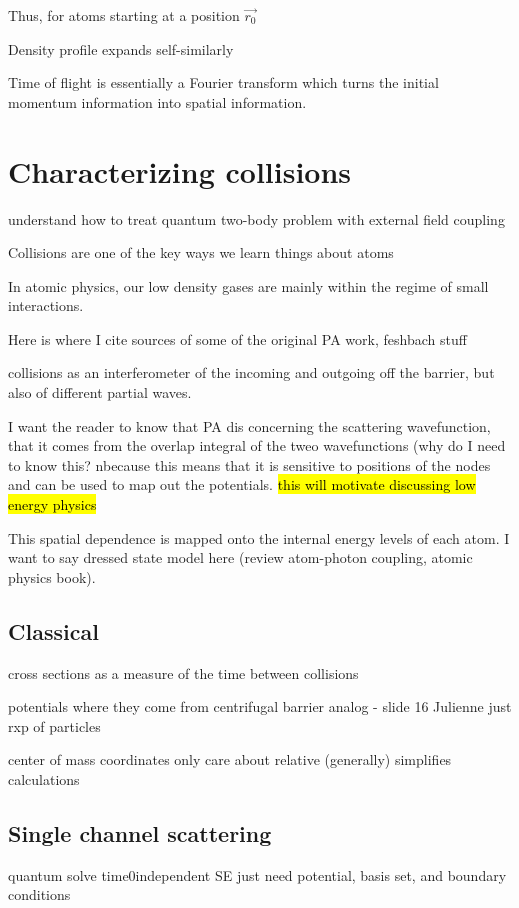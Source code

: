 Thus, for atoms starting at a position $\vec{r_0}$ 

Density profile expands self-similarly 

Time of flight is essentially a Fourier transform which turns the initial momentum information into spatial information.



\section{Characterizing collisions} \label{sec:cold_collisions}
understand how to treat quantum two-body problem with external field coupling

Collisions are one of the key ways we learn things about atoms 

In atomic physics, our low density gases are mainly within the regime of small interactions. 

Here is where I cite sources of some of the original PA work, feshbach stuff

collisions as an interferometer of the incoming and outgoing off the barrier, but also of different partial waves.

I want the reader to know that PA dis concerning the scattering wavefunction, that it comes from the overlap integral of the tweo wavefunctions (why do I need to know this? nbecause this means that it is sensitive to positions of the nodes and can be used to map out the potentials. \hl{this will motivate discussing low energy physics}

This spatial dependence is mapped onto the internal energy levels of each atom. I want to say dressed state model here (review atom-photon coupling, atomic physics book).


\subsection{Classical} \label{ssec:classical}
cross sections
			as a measure of the time between collisions
			
		potentials
			where they come from
		centrifugal barrier
			analog - slide 16 Julienne
			just rxp of particles
			
		center of mass coordinates
			only care  about relative (generally)
			simplifies calculations

\subsection{Single channel scattering} \label{ssec:single_chan}
quantum
	solve time0independent SE
	just need potential, basis set, and boundary conditions
		
